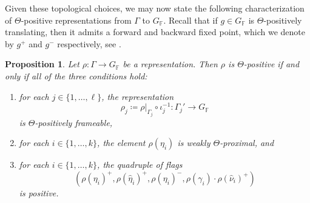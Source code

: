 \documentclass{amsart}
\theoremstyle{plain}
\newtheorem{proposition}{Proposition}[section]
\theoremstyle{definition}
\DeclareMathOperator{\Fb}{{\mathbb{F}}}
\newcommand{\1}{\mathbf{1}}
\begin{document}
Given these topological choices, we may now state the following characterization of $\Theta$-positive representations from $\Gamma$ to $G_{\Fb}$. Recall that if $g\in G_{\Fb}$ is $\Theta$-positively translating, then it admits a forward and backward fixed point, which we denote by $g^+$ and $g^-$ respectively, see .

\begin{proposition}
\label{propo: cutting lemma}
Let $\rho:\Gamma \to G_{\Fb}$ be a representation. Then $\rho$ is $\Theta$-positive if and only if all of the three conditions hold:
\begin{enumerate}
\item for each $j\in\{1,\dots,\ell\}$, the representation
\[\rho_j \coloneqq \rho|_{\Gamma_j}\circ\iota_j^{-1} \colon \Gamma_j'\to G_{\Fb}\] 
is $\Theta$-positively frameable, 
\item for each $i\in \{1, \ldots, k\}$, the element $\rho(\eta_i)$ is weakly $\Theta$-proximal, and
\item for each $i\in\{1,\dots,k\}$, the quadruple of flags
\[\left(\rho(\eta_i)^+,\rho(\hat\eta_i)^+,\rho(\eta_i)^-,\rho(\gamma_i)\cdot \rho(\hat\nu_i)^+\right)\] 
is positive.
\end{enumerate}
\end{proposition}
\end{document}
